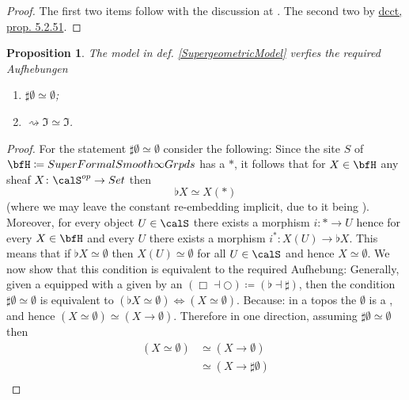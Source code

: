 \documentclass[12pt,titlepage]{article}
\theoremstyle{plain}
\newtheorem{prop}{Proposition}
\theoremstyle{definition}
\theoremstyle{remark}
\begin{document}
\begin{proof}
The first two items follow with the discussion at . The second two by \hyperlink{dcct}{dcct, prop. 5.2.51}.
\end{proof}
\begin{prop}
\label{SublationsRealized}\hypertarget{SublationsRealized}{}
The model in def. \ref{SupergeometricModel} verfies the required Aufhebungen
\begin{enumerate}%
\item $\sharp \emptyset \simeq \emptyset$;
\item $\rightsquigarrow \Im \simeq \Im$.
\end{enumerate}
\end{prop}
\begin{proof}
For the statement $\sharp \emptyset \simeq \emptyset$ consider the following:
Since the site $S$ of $\bfH \coloneqq SuperFormalSmooth\infty Grpds$ has a  $\ast$, it follows that for $X\in \bfH$ any sheaf $X \colon \calS^{op}\to Set$ then
\begin{displaymath}
\flat X \simeq X(\ast)
\end{displaymath}
(where we may leave the constant re-embedding implicit, due to it being ).
Moreover, for every object $U\in \calS$ there exists a morphism $i \colon \ast \to U$ hence for every $X\in \bfH$ and every $U$ there exists a morphism $i^\ast \colon X(U)\to \flat X$. This means that if $\flat X \simeq \emptyset$ then $X(U) \simeq \emptyset$ for all $U \in \calS$ and hence $X\simeq \emptyset$.
We now show that this condition is equivalent to the required Aufhebung:
Generally, given a  equipped with a  given by an  $(\Box\dashv \bigcirc) \coloneqq (\flat \dashv \sharp)$, then the condition $\sharp \emptyset \simeq \emptyset$ is equivalent to $(\flat X \simeq \emptyset) \Leftrightarrow (X \simeq \emptyset)$.
Because: in a topos the  $\emptyset$ is a , and hence $(X \simeq \emptyset) \simeq (X \to \emptyset)$. Therefore in one direction, assuming $\sharp \emptyset \simeq \emptyset$ then
\begin{displaymath}
\begin{aligned}
(X \simeq \emptyset)
& \simeq
(X \to \emptyset)
\\
& \simeq (X \to \sharp \emptyset)
\\

\end{aligned}
\end{displaymath}
\end{proof}
\end{document}
